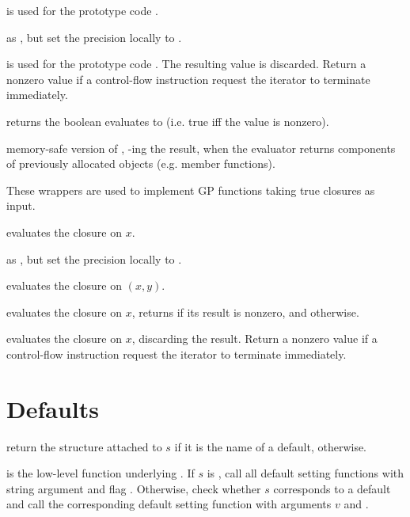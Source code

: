  is used for the prototype code .

 as , but
set the precision locally to .

 is used for the prototype code
. The resulting value is discarded.  Return a nonzero value if a
control-flow instruction request the iterator to terminate immediately.

 returns the boolean
 evaluates to (i.e. true iff the value is nonzero).

 memory-safe version of ,
-ing the result, when the evaluator returns components of
previously allocated objects (e.g. member functions).

These wrappers are used to implement GP functions taking true closures as
input.

 evaluates the closure  on $x$.

 as ,
but set the precision locally to .

 evaluates the closure 
on $(x,y)$.

 evaluates the closure  on
$x$, returns  if its result is nonzero, and  otherwise.

 evaluates the closure  on
$x$, discarding the result. Return a nonzero value if a control-flow
instruction request the iterator to terminate immediately.

\section{Defaults}

 return the 
structure attached to $s$ if it is the name of a default, 
otherwise.

 is the
low-level function underlying . If $s$ is , call all
default setting functions with string argument  and flag
. Otherwise, check whether $s$ corresponds to a default
and call the corresponding default setting function with arguments $v$ and
\fl.

